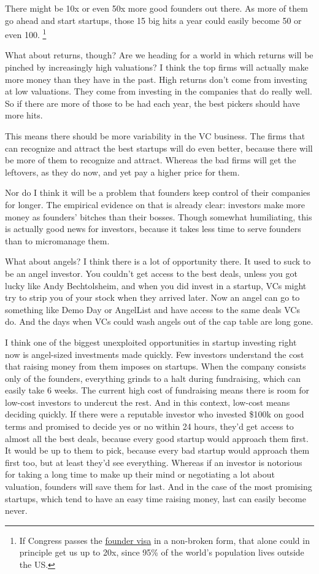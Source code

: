 \documentclass[12pt]{book}
\begin{document}
There might be 10x or even 50x more good founders out there. As more of
them go ahead and start startups, those 15 big hits a year could easily
become 50 or even 100. \footnote{If Congress passes the \href{foundervisa.html}{founder visa} in
a non-broken form, that alone could in principle get us up to 20x, since
95\% of the world's population lives outside the US.}

What about returns, though? Are we heading for a world in which returns
will be pinched by increasingly high valuations? I think the top firms
will actually make more money than they have in the past. High returns
don't come from investing at low valuations. They come from investing in
the companies that do really well. So if there are more of those to be
had each year, the best pickers should have more hits.

This means there should be more variability in the VC business. The
firms that can recognize and attract the best startups will do even
better, because there will be more of them to recognize and attract.
Whereas the bad firms will get the leftovers, as they do now, and yet
pay a higher price for them.

Nor do I think it will be a problem that founders keep control of their
companies for longer. The empirical evidence on that is already clear:
investors make more money as founders' bitches than their bosses. Though
somewhat humiliating, this is actually good news for investors, because
it takes less time to serve founders than to micromanage them.

What about angels? I think there is a lot of opportunity there. It used
to suck to be an angel investor. You couldn't get access to the best
deals, unless you got lucky like Andy Bechtolsheim, and when you did
invest in a startup, VCs might try to strip you of your stock when they
arrived later. Now an angel can go to something like Demo Day or
AngelList and have access to the same deals VCs do. And the days when
VCs could wash angels out of the cap table are long gone.

I think one of the biggest unexploited opportunities in startup
investing right now is angel-sized investments made quickly. Few
investors understand the cost that raising money from them imposes on
startups. When the company consists only of the founders, everything
grinds to a halt during fundraising, which can easily take 6 weeks. The
current high cost of fundraising means there is room for low-cost
investors to undercut the rest. And in this context, low-cost means
deciding quickly. If there were a reputable investor who invested \$100k
on good terms and promised to decide yes or no within 24 hours, they'd
get access to almost all the best deals, because every good startup
would approach them first. It would be up to them to pick, because every
bad startup would approach them first too, but at least they'd see
everything. Whereas if an investor is notorious for taking a long time
to make up their mind or negotiating a lot about valuation, founders
will save them for last. And in the case of the most promising startups,
which tend to have an easy time raising money, last can easily become
never.
\end{document}

